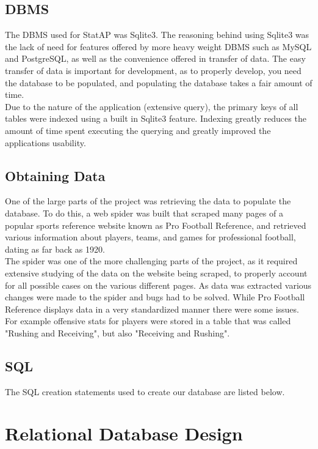 \documentclass[12pt,letterpaper]{article}
\begin{document}
\subsection{DBMS}
The DBMS used for StatAP was Sqlite3. The reasoning behind using Sqlite3 was
the lack of need for features offered by more heavy weight DBMS such as MySQL
and PostgreSQL, as well as the convenience offered in transfer of data.
The easy transfer of data is important for development, as to properly develop,
you need the database to be populated, and populating the database takes a fair
amount of time.\\
Due to the nature of the application (extensive query), the primary keys of all tables were indexed using a built in Sqlite3 feature. Indexing greatly reduces the amount of time spent executing the querying and greatly improved the applications usability.

\subsection{Obtaining Data}
One of the large parts of the project was retrieving the data to populate the
database. To do this, a web spider was built that scraped many pages of a
popular sports reference website known as Pro Football Reference,
and retrieved various information about players, teams, and games for
professional football, dating as far back as 1920. \\
The spider was one of the more challenging parts of the project, as it
required extensive studying of the data on the website being scraped, to
properly account for all possible cases on the various different pages. As data was extracted various changes were made to the spider and bugs had to be solved. While Pro Football Reference displays data in a very standardized manner there were some issues. For example offensive stats for players were stored in a table that was called "Rushing and Receiving", but also "Receiving and Rushing".\\

\subsection{SQL}
The SQL creation statements used to create our database are listed below.

\clearpage\null

\section{Relational Database Design}
\end{document}
